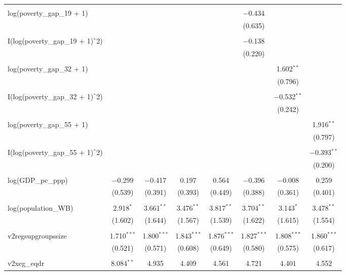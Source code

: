 \documentclass[a4paper, 12pt]{article}
\begin{document}
\begin{table}[!htbp]
{\begin{tabular}{@{\extracolsep{5pt}}lccccccc}
  & & & & & & & \\ 
 log(poverty\_gap\_19 + 1) &  &  &  &  & $-$0.434 &  &  \\ 
  &  &  &  &  & (0.635) &  &  \\ 
  & & & & & & & \\ 
 I(log(poverty\_gap\_19 + 1)$\hat{\mkern6mu}$2) &  &  &  &  & $-$0.138 &  &  \\ 
  &  &  &  &  & (0.220) &  &  \\ 
  & & & & & & & \\ 
 log(poverty\_gap\_32 + 1) &  &  &  &  &  & 1.602$^{**}$ &  \\ 
  &  &  &  &  &  & (0.796) &  \\ 
  & & & & & & & \\ 
 I(log(poverty\_gap\_32 + 1)$\hat{\mkern6mu}$2) &  &  &  &  &  & $-$0.532$^{**}$ &  \\ 
  &  &  &  &  &  & (0.242) &  \\ 
  & & & & & & & \\ 
 log(poverty\_gap\_55 + 1) &  &  &  &  &  &  & 1.916$^{**}$ \\ 
  &  &  &  &  &  &  & (0.797) \\ 
  & & & & & & & \\ 
 I(log(poverty\_gap\_55 + 1)$\hat{\mkern6mu}$2) &  &  &  &  &  &  & $-$0.393$^{**}$ \\ 
  &  &  &  &  &  &  & (0.200) \\ 
  & & & & & & & \\ 
 log(GDP\_pc\_ppp) & $-$0.299 & $-$0.417 & 0.197 & 0.564 & $-$0.396 & $-$0.008 & 0.259 \\ 
  & (0.539) & (0.391) & (0.393) & (0.449) & (0.388) & (0.361) & (0.401) \\ 
  & & & & & & & \\ 
 log(population\_WB) & 2.918$^{*}$ & 3.661$^{**}$ & 3.476$^{**}$ & 3.817$^{**}$ & 3.704$^{**}$ & 3.143$^{*}$ & 3.478$^{**}$ \\ 
  & (1.602) & (1.644) & (1.567) & (1.539) & (1.622) & (1.615) & (1.554) \\ 
  & & & & & & & \\ 
 v2regsupgroupssize & 1.710$^{***}$ & 1.800$^{***}$ & 1.843$^{***}$ & 1.876$^{***}$ & 1.827$^{***}$ & 1.808$^{***}$ & 1.860$^{***}$ \\ 
  & (0.521) & (0.571) & (0.608) & (0.649) & (0.580) & (0.575) & (0.617) \\ 
  & & & & & & & \\ 
 v2xeg\_eqdr & 8.084$^{**}$ & 4.935 & 4.409 & 4.561 & 4.721 & 4.401 & 4.552 \\ 

\end{tabular}}
\end{table}
\end{document}
